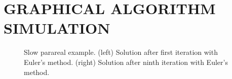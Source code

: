 \documentclass[12pt]{article}
\begin{document}
\section*{\normalsize GRAPHICAL ALGORITHM SIMULATION}

\begin{figure}
\caption{Slow parareal
example. (left) Solution after first iteration with Euler's method. (right)
Solution after ninth iteration with Euler's method.}
\label{sinPara}
\end{figure}
\end{document}
